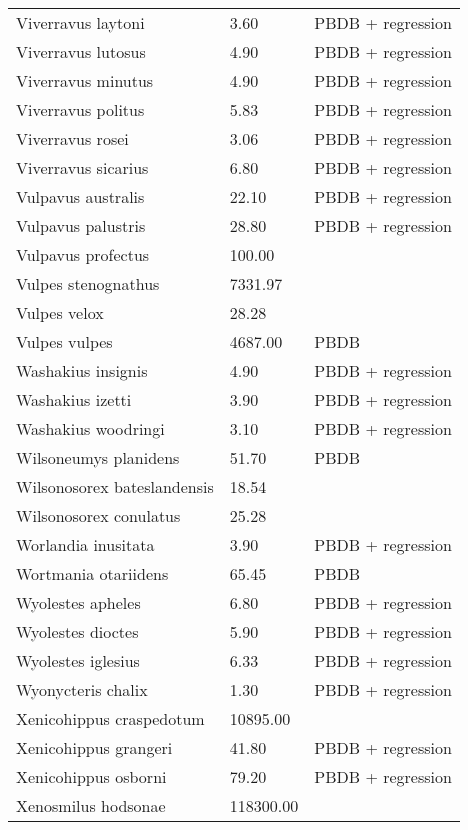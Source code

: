 \begin{longtable}{p{} p{} p{}}
    Viverravus laytoni & 3.60 & PBDB + regression \\ 
    Viverravus lutosus & 4.90 & PBDB + regression \\ 
    Viverravus minutus & 4.90 & PBDB + regression \\ 
    Viverravus politus & 5.83 & PBDB + regression \\ 
    Viverravus rosei & 3.06 & PBDB + regression \\ 
    Viverravus sicarius & 6.80 & PBDB + regression \\ 
    Vulpavus australis & 22.10 & PBDB + regression \\ 
    Vulpavus palustris & 28.80 & PBDB + regression \\ 
    Vulpavus profectus & 100.00 & \cite{Williamson2013} \\ 
    Vulpes stenognathus & 7331.97 & \cite{Tomiya2013} \\ 
    Vulpes velox & 28.28 & \cite{Smith2004} \\ 
    Vulpes vulpes & 4687.00 & PBDB \\ 
    Washakius insignis & 4.90 & PBDB + regression \\ 
    Washakius izetti & 3.90 & PBDB + regression \\ 
    Washakius woodringi & 3.10 & PBDB + regression \\ 
    Wilsoneumys planidens & 51.70 & PBDB \\ 
    Wilsonosorex bateslandensis & 18.54 & \cite{Tomiya2013} \\ 
    Wilsonosorex conulatus & 25.28 & \cite{Tomiya2013} \\ 
    Worlandia inusitata & 3.90 & PBDB + regression \\ 
    Wortmania otariidens & 65.45 & PBDB \\ 
    Wyolestes apheles & 6.80 & PBDB + regression \\ 
    Wyolestes dioctes & 5.90 & PBDB + regression \\ 
    Wyolestes iglesius & 6.33 & PBDB + regression \\ 
    Wyonycteris chalix & 1.30 & PBDB + regression \\ 
    Xenicohippus craspedotum & 10895.00 & \cite{McKenna2011} \\ 
    Xenicohippus grangeri & 41.80 & PBDB + regression \\ 
    Xenicohippus osborni & 79.20 & PBDB + regression \\ 
    Xenosmilus hodsonae & 118300.00 & \cite{Torregrosa2010} \\ 

\end{longtable}
